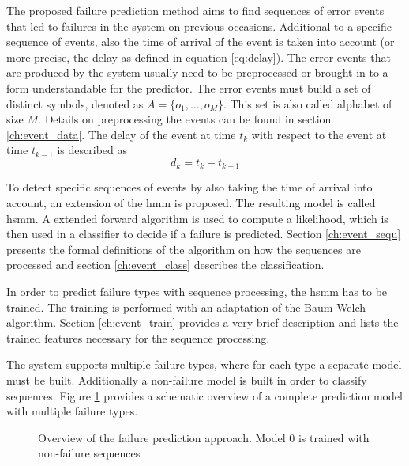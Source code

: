 \documentclass[mscthesis]{usiinfthesis}
\begin{document}
The proposed failure prediction method aims to find sequences of error events
that led to failures in the system on previous occasions. Additional to
a specific sequence of events, also the time of arrival of the event is taken
into account (or more precise, the delay as defined in equation
\ref{eq:delay}). The error events that are produced by the system usually need
to be preprocessed or brought in to a form understandable for the predictor.
The error events must build a set of distinct symbols, denoted as $A=\{o_1,
\dots, o_M\}$. This set is also called alphabet of size $M$. Details on
preprocessing the events can be found in section \ref{ch:event_data}. The
delay of the event at time $ t_k $ with respect to the event at time $ t_{k-1}
$ is described as
\begin{equation}
\label{eq:delay}
    d_k = t_k-t_{k-1}
\end{equation}

To detect specific sequences of events by also taking the time of arrival into
account, an extension of the \gls{hmm} is proposed. The resulting model is
called \acrfull{hsmm}. A extended forward algorithm is used to compute
a likelihood, which is then used in a classifier to decide if a failure is
predicted. Section \ref{ch:event_sequ} presents the formal definitions of the
algorithm on how the sequences are processed and section \ref{ch:event_class}
describes the classification.

In order to predict failure types with sequence processing, the \gls{hsmm} has
to be trained. The training is performed with an adaptation of the Baum-Welch
algorithm. Section \ref{ch:event_train} provides a very brief description and
lists the trained features necessary for the sequence processing.

The system supports multiple failure types, where for each type a separate
model must be built. Additionally a non-failure model is built in order to
classify sequences. Figure \ref{fig:model} provides a schematic overview of
a complete prediction model with multiple failure types.

\begin{figure}
    \centering
    
    \caption{Overview of the failure prediction approach. Model 0 is trained
        with non-failure sequences}
    \label{fig:model}
\end{figure}

\end{document}
